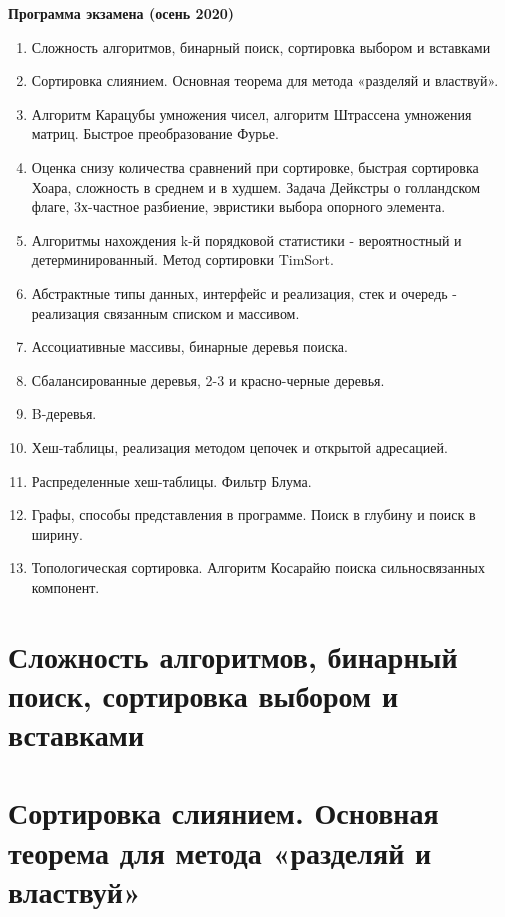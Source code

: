 \documentclass[specialist, subf, href, colorlinks=true, 12pt, times, mtpro, final]{disser}
\begin{document}
\tableofcontents

\newpage
{\Large \bf Программа экзамена (осень 2020)}
{\small
\begin{enumerate}
\item Сложность алгоритмов, бинарный поиск, сортировка выбором и вставками
\item Сортировка слиянием. Основная теорема для метода «разделяй и властвуй».
\item Алгоритм Карацубы умножения чисел, алгоритм Штрассена умножения матриц. Быстрое преобразование Фурье.
\item Оценка снизу количества сравнений при сортировке, быстрая сортировка Хоара, сложность в среднем и в худшем. Задача Дейкстры о голландском флаге, 3х-частное разбиение, эвристики выбора опорного элемента.
\item Алгоритмы нахождения k-й порядковой статистики - вероятностный и детерминированный. Метод сортировки TimSort.
\item Абстрактные типы данных, интерфейс и реализация, стек и очередь - реализация связанным списком и массивом.
\item Ассоциативные массивы, бинарные деревья поиска.
\item Сбалансированные деревья, 2-3 и красно-черные деревья.
\item B-деревья.
\item Хеш-таблицы, реализация методом цепочек и открытой адресацией.
\item Распределенные хеш-таблицы. Фильтр Блума.
\item Графы, способы представления в программе. Поиск в глубину и поиск в ширину.
\item Топологическая сортировка. Алгоритм Косарайю поиска сильносвязанных компонент.
\end{enumerate}
}

\section {Сложность алгоритмов, бинарный поиск, сортировка выбором и вставками}
\section {Сортировка слиянием. Основная теорема для метода «разделяй и властвуй»}
 
\end{document}
